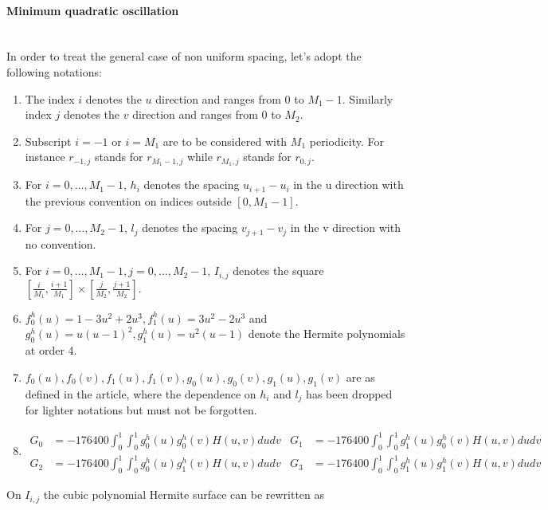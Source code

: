 \documentclass[a4paper, 11pt]{article}
\begin{document}
\paragraph{Minimum quadratic oscillation} \mbox{}\\

In order to treat the general case of non uniform spacing, let's adopt the following notations:

\begin{enumerate}
  \item The index $i$ denotes the $u$ direction and ranges from $0$ to $M_1-1$. Similarly index $j$ denotes the $v$ 
    direction and ranges from $0$ to $M_2$.
  \item Subscript $i=-1$ or $i=M_1$ are to be considered with $M_1$ periodicity. For instance $r_{-1, j}$ stands for 
    $r_{M_1-1,j}$ while $r_{M_1, j}$ stands for $r_{0,j}$.
  \item For $i=0, \ldots, M_1-1$, $h_i$ denotes the spacing $u_{i+1}-u_i$ in the u direction with the previous 
    convention on indices outside $[0, M_1-1]$.
  \item For $j=0, \ldots, M_2-1$, $l_j$ denotes the spacing $v_{j+1}-v_j$ in the v direction with no convention.
  \item For $i=0, \ldots, M_1-1, j=0, \ldots, M_2-1$, $I_{i,j}$ denotes the square $[\frac{i}{M_1}, 
    \frac{i+1}{M_1}]\times[\frac{j}{M_2}, \frac{j+1}{M_2}]$.
  \item $f_0^h(u) = 1-3u^2 + 2u^3, f_1^h(u) = 3u^2-2u^3$ and $g_0^h(u) = u{(u-1)}^2, g_1^h(u) = u^2(u-1)$ denote the 
    Hermite polynomials at order 4.
  \item $f_0(u), f_0(v), f_1(u), f_1(v), g_0(u), g_0(v), g_1(u), g_1(v)$ are as defined in the article, where the 
    dependence on $h_i$ and $l_j$ has been dropped for lighter notations but must not be forgotten.
  \item
    \begin{align*}
      G_0 &= -176400\int_0^1 \int_0^1 g_0^h(u) g_0^h(v)H(u,v)dudv & G_1 &= -176400\int_0^1 \int_0^1 g_1^h(u) 
      g_0^h(v)H(u,v)dudv \\
      G_2 &= -176400\int_0^1 \int_0^1 g_0^h(u) g_1^h(v)H(u,v)dudv & G_3 &= -176400\int_0^1 \int_0^1 g_1^h(u) 
      g_1^h(v)H(u,v)dudv
    \end{align*}
  \end{enumerate}


On $I_{i,j}$ the cubic polynomial Hermite surface can be rewritten as
\end{document}
